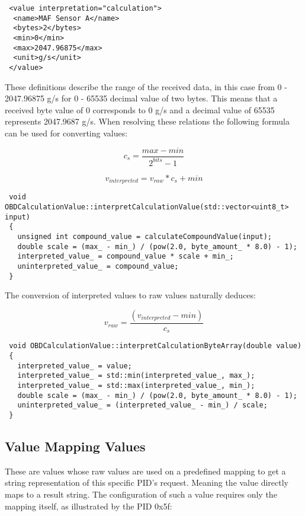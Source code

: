 \begin{verbatim}
 <value interpretation="calculation">
  <name>MAF Sensor A</name>
  <bytes>2</bytes>
  <min>0</min>
  <max>2047.96875</max>
  <unit>g/s</unit>
 </value>
\end{verbatim}

These definitions describe the range of the received data, in this case from 0 - 2047.96875 g/s for 0 - 65535 decimal value of two bytes. 
This means that a received byte value of 0 corresponds to 0 g/s and a decimal value of 65535 represents 2047.9687 g/s. When resolving these 
relations the following formula can be used for converting values: 

\[ c_s = \frac{max - min}{2^{bits} - 1} \]

\[ v_{interpreted} = v_{raw} * c_s + min \]

\begin{verbatim}
 void OBDCalculationValue::interpretCalculationValue(std::vector<uint8_t> input)
 {
   unsigned int compound_value = calculateCompoundValue(input);
   double scale = (max_ - min_) / (pow(2.0, byte_amount_ * 8.0) - 1);
   interpreted_value_ = compound_value * scale + min_;
   uninterpreted_value_ = compound_value;
 }
\end{verbatim}

The conversion of interpreted values to raw values  naturally deduces:

\[ v_{raw} = \frac{(v_{interpreted} - min)}{c_s} \]

\begin{verbatim}
 void OBDCalculationValue::interpretCalculationByteArray(double value)
 {
   interpreted_value_ = value;
   interpreted_value_ = std::min(interpreted_value_, max_);
   interpreted_value_ = std::max(interpreted_value_, min_);
   double scale = (max_ - min_) / (pow(2.0, byte_amount_ * 8.0) - 1);
   uninterpreted_value_ = (interpreted_value_ - min_) / scale;
 }
\end{verbatim}

\subsection{Value Mapping Values}

These are values whose raw values are used on a predefined mapping to get a string representation of this specific PID’s request. Meaning the 
value directly maps to a result string. The configuration of such a value requires only the mapping itself, as illustrated by the PID 0x5f:

